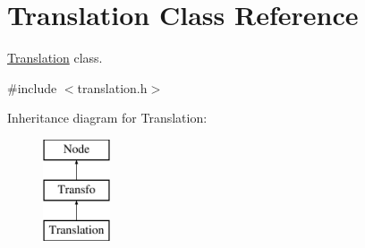 \hypertarget{class_translation}{
\section{\-Translation \-Class \-Reference}
\label{class_translation}
}


\hyperlink{class_translation}{\-Translation} class.  




{\ttfamily \#include $<$translation.\-h$>$}

\-Inheritance diagram for \-Translation\-:\begin{figure}[H]
\begin{center}
\leavevmode
\includegraphics[height=3.000000cm]{class_translation}
\end{center}
\end{figure}

